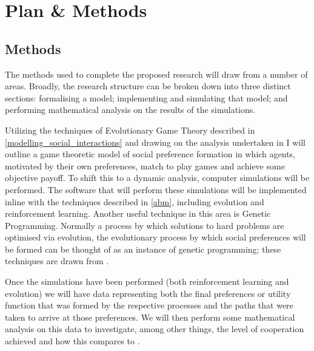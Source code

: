 \documentclass[11pt]{article}
\newcommand*{\np}{\par\noindent\newline}
\begin{document}
\section{Plan \& Methods}
\subsection{Methods}
The methods used to complete the proposed research will draw from a number of
areas. Broadly, the research structure can be broken down into three distinct
sections: formalising a model; implementing and simulating that model; and
performing mathematical analysis on the results of the simulations.
\np Utilizing the techniques of Evolutionary Game Theory described in
\ref{modelling_social_interactions} and drawing on the analysis undertaken in
\cite{alger_homo_2013} I will outline a game theoretic model of social
preference formation in which agents, motivated by their own preferences, match
to play games and achieve some objective payoff. To shift this to a dynamic
analysis, computer simulations will be performed. The software that will
perform these simulations will be implemented inline with the techniques
described in \ref{abm}, including evolution and reinforcement learning. Another
useful technique in this area is Genetic Programming. Normally a process by
which solutions to hard problems are optimised via evolution, the evolutionary
process by which social preferences will be formed can be thought of as an
instance of genetic programming; these techniques are drawn from
\cite{poli_field_2008}.
\np Once the simulations have been performed (both reinforcement learning and
evolution) we will have data representing both the final preferences or
utility function that was formed by the respective processes and the paths
that were taken to arrive at those preferences. We will then perform some
mathematical analysis on this data to investigate, among other things, the
level of cooperation achieved and how this compares to \cite{alger_homo_2013}.
\end{document}
